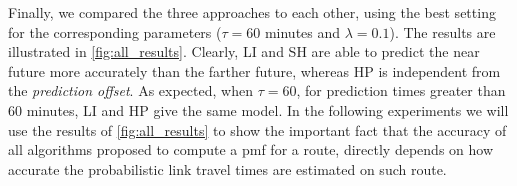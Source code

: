 Finally, we compared the three approaches to each other, using the best setting for the corresponding parameters ($\tau = 60$ minutes and $\lambda = 0.1$). The results are illustrated in \cref{fig:all_results}. Clearly, LI and SH are able to predict the near future more accurately than the farther future, whereas HP is independent from the \textit{prediction offset}. As expected, when $\tau = 60$, for prediction times greater than 60 minutes, LI and HP give the same model. In the following experiments we will use the results of \cref{fig:all_results} to show the important fact that the accuracy of all algorithms proposed to compute a pmf for a route, directly depends on how accurate the probabilistic link travel times are estimated on such route.

